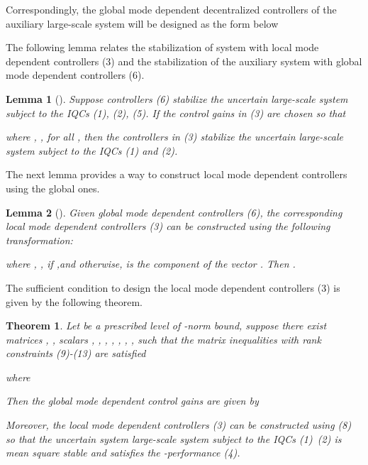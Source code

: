 \documentclass[11pt,draftcls,onecolumn]{IEEEtran}
\newtheorem{theorem}{Theorem}
\newtheorem{lemma}{Lemma}
\begin{document}
Correspondingly, the global mode dependent decentralized controllers of the auxiliary large-scale system will be designed as the form below


The following lemma relates the stabilization of system   with local mode dependent controllers (3) and the stabilization of the auxiliary system   with global mode dependent controllers (6).

\begin{lemma} [\cite{Xiong2009}]
\label{lemma 1}
Suppose controllers (6) stabilize the uncertain large-scale system   subject to the IQCs (1), (2), (5). If the control gains  in (3) are chosen so that

where , , for all , then the controllers in (3) stabilize the uncertain large-scale system   subject to the IQCs (1) and (2).
\end{lemma}
The next lemma provides a way to construct local mode dependent controllers using the global ones.
\begin{lemma}[\cite{Xiong2009}]
\label{lemma 2}
Given  global mode dependent controllers (6), the corresponding local mode dependent controllers (3) can be constructed using the following transformation:

where , ,  if ,and  otherwise,  is the  component of the vector .  Then .
\end{lemma}

 The sufficient condition to design the local mode dependent controllers (3) is given by the following theorem.

\begin{theorem}
\label{theorem 1}
Let  be a prescribed level of -norm bound, suppose there exist matrices , , scalars , , ,  , , , , such that the matrix inequalities with rank constraints (9)-(13) are satisfied




  
where


Then the global mode dependent control gains  are given by


Moreover,  the local mode dependent controllers (3) can be constructed using (8) so that the uncertain system large-scale system  subject to the IQCs (1)~(2) is mean square stable and satisfies the -performance (4).
\end{theorem}
\end{document}
